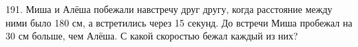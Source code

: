 191. Миша и Алёша побежали  навстречу друг другу, когда расстояние между ними было 180 см, а встретились через 15 секунд. До встречи Миша пробежал на 30 см больше, чем Алёша. С какой скоростью бежал каждый из них?\\
